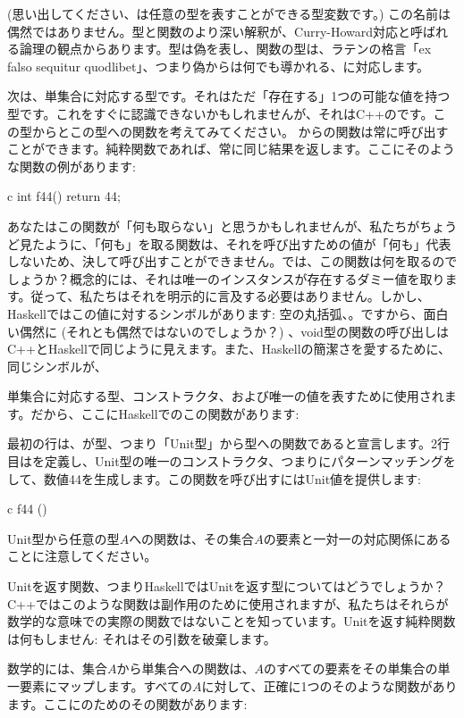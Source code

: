  (思い出してください、は任意の型を表すことができる型変数です。) この名前は偶然ではありません。型と関数のより深い解釈が、Curry-Howard対応と呼ばれる論理の観点からあります。型は偽を表し、関数の型は、ラテンの格言「ex falso sequitur quodlibet」、つまり偽からは何でも導かれる、に対応します。

次は、単集合に対応する型です。それはただ「存在する」1つの可能な値を持つ型です。これをすぐに認識できないかもしれませんが、それはC++のです。この型からとこの型への関数を考えてみてください。 からの関数は常に呼び出すことができます。純粋関数であれば、常に同じ結果を返します。ここにそのような関数の例があります: 

\begin{snip}{c}
int f44() { return 44; }
\end{snip}
あなたはこの関数が「何も取らない」と思うかもしれませんが、私たちがちょうど見たように、「何も」を取る関数は、それを呼び出すための値が「何も」代表しないため、決して呼び出すことができません。では、この関数は何を取るのでしょうか？概念的には、それは唯一のインスタンスが存在するダミー値を取ります。従って、私たちはそれを明示的に言及する必要はありません。しかし、Haskellではこの値に対するシンボルがあります: 空の丸括弧、\code{()}。ですから、面白い偶然に (それとも偶然ではないのでしょうか？) 、void型の関数の呼び出しはC++とHaskellで同じように見えます。また、Haskellの簡潔さを愛するために、同じシンボル\code{()}が、

単集合に対応する型、コンストラクタ、および唯一の値を表すために使用されます。だから、ここにHaskellでのこの関数があります: 

最初の行は、が型\code{()}、つまり「Unit型」から型への関数であると宣言します。2行目はを定義し、Unit型の唯一のコンストラクタ、つまり\code{()}にパターンマッチングをして、数値44を生成します。この関数を呼び出すにはUnit値\code{()}を提供します: 

\begin{snip}{c}
f44 ()
\end{snip}
Unit型から任意の型$A$への関数は、その集合$A$の要素と一対一の対応関係にあることに注意してください。

Unitを返す関数、つまりHaskellではUnitを返す型についてはどうでしょうか？C++ではこのような関数は副作用のために使用されますが、私たちはそれらが数学的な意味での実際の関数ではないことを知っています。Unitを返す純粋関数は何もしません: それはその引数を破棄します。

数学的には、集合$A$から単集合への関数は、$A$のすべての要素をその単集合の単一要素にマップします。すべての$A$に対して、正確に1つのそのような関数があります。ここにのためのその関数があります: 

